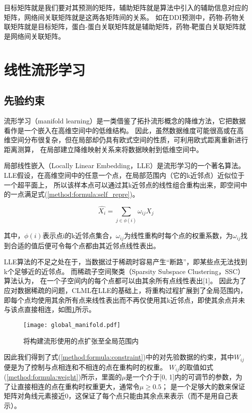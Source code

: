 目标矩阵就是我们要对其预测的矩阵，辅助矩阵就是算法中引入的辅助信息对应的矩阵，网络间关联矩阵就是这两各矩阵间的关系。
如在DDI预测中，药物-药物关联矩阵就是目标矩阵，蛋白-蛋白关联矩阵就是辅助矩阵，药物-靶蛋白关联矩阵就是网络间关联矩阵。


\section{线性流形学习}
\subsection{先验约束}
\label{method:subsec:prior}
流形学习（manifold learning）是一类借鉴了拓扑流形概念的降维方法，它把数据看作是一个嵌入在高维空间中的低维结构。
因此，虽然数据维度可能很高或在高维空间分布很复杂，但在局部却仍具有欧式空间的性质，可利用欧式距离重新进行距离测算，
在局部建立降维映射关系来将数据映射到低维空间中。


局部线性嵌入（Locally Linear Embedding，LLE）是流形学习的一个著名算法。
LLE假设，在高维空间中的任意一个点，在局部范围内（它的k近邻点）近似位于一个超平面上，
所以该样本点可以通过其k近邻点的线性组合重构出来，即空间中的一点满足式(\ref{method:formula:self_repre})。


\begin{equation}
    \hat{X_i}=\sum_{j\in\phi(i)}\omega_{ij}X_j \label{method:formula:self_repre}
\end{equation}

其中，$\phi(i)$表示点i的k近邻点集合，$\omega_{ij}$为线性重构时每个点的权重系数，为$\omega_{ij}$找到合适的值后便可令每个点都由其近邻点线性表出。


LLE算法的不足之处在于，当数据过于稀疏时容易产生“断路”，即某些点无法找到k个足够近的近邻点。
而稀疏子空间聚类（Sparsity Subspace Clustering，SSC）算法认为，
在一个子空间内的每个点都可以由其余所有点线性表出[1]。
因此为了应对数据稀疏的问题，CLML在LLE的基础上，将重构过程扩展到了全局范围内，
即每个点均使用其余所有点来线性表出而不再仅使用其k近邻点，即使其余点并未与该点直接相连，如图\ref{method:fig:global_manifold}所示。

\begin{figure}
    \centering
    \texttt{[image: global\_manifold.pdf]}
    \caption{将构建流形使用的点扩张至全局范围内}
    \label{method:fig:global_manifold}
\end{figure}

因此我们得到了式(\ref{method:formula:constraint})中的对先验数据的约束，其中$W_{ij}$便是为了控制与点相连和不相连的点在重构时的权重。
$W_{ij}$的取值如式(\ref{method:formula:weight})所示，里面的$\mu$是一个介于[0, 1]内的可调节的参数，为了让直接相连的点在重构时权重更大，通常令$\mu\geq0.5$；
是一个足够大的数来保证矩阵对角线元素接近0，这保证了每个点只能由其余点来表示（而不是用自己表示）。


